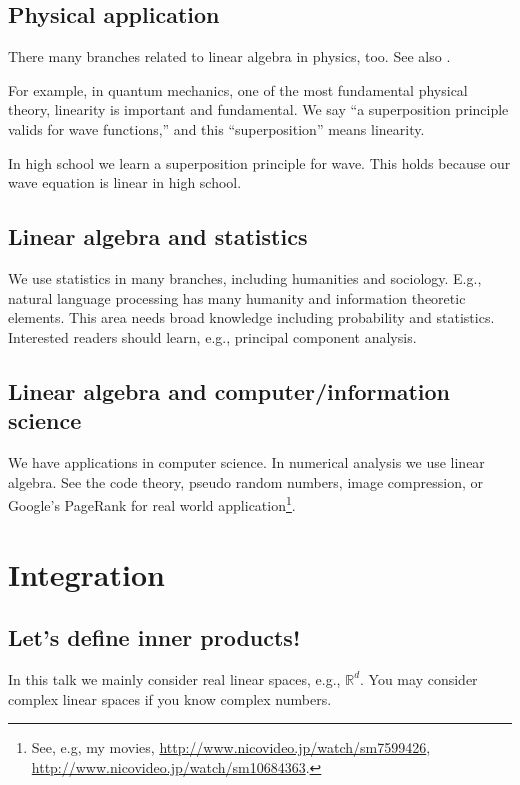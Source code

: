 \documentclass[openany, a4paper, oneside]{jsbook}
\theoremstyle{break}
\theoremstyle{breakdefn}
\newcommand{\bbRd}{\mathbb{R}^d}
\begin{document}
\subsection{Physical application}


There many branches related to linear algebra in physics, too.
See also \cite{phasetr2}.

For example, in quantum mechanics, one of the most fundamental physical theory,
linearity is important and fundamental.
We say ``a superposition principle valids for wave functions,''
and this ``superposition'' means linearity.

In high school we learn a superposition principle for wave.
This holds because our wave equation is linear in high school.
\subsection{Linear algebra and statistics}


We use statistics in many branches, including humanities and sociology.
E.g., natural language processing has many humanity and information theoretic elements.
This area needs broad knowledge including probability and statistics.
Interested readers should learn, e.g., principal component analysis.
\subsection{Linear algebra and computer/information science}


We have applications in computer science.
In numerical analysis we use linear algebra.
See the code theory, pseudo random numbers, image compression, or Google's
PageRank for real world application\footnote{See, e.g, my movies,
\href{http://www.nicovideo.jp/watch/sm7599426}{http://www.nicovideo.jp/watch/sm7599426}, \href{http://www.nicovideo.jp/watch/sm10684363}{http://www.nicovideo.jp/watch/sm10684363}.
 }.
\section{Integration}

\subsection{Let's define inner products!}


In this talk we mainly consider real linear spaces, e.g., $\bbRd$.
You may consider complex linear spaces if you know complex numbers.
\end{document}
